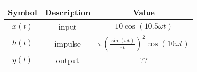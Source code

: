 \begin{tabular}{|c|c|c|}    \hline
     \textbf{Symbol} & \textbf{Description} &     \textbf{Value}\\
    \hline     $x(t)$ &  input &  $10 \cos(10.5 \omega t)$\\[6pt]
    \hline      $h(t)$ & impulse & $\pi\left(\frac{\sin(\omega t)}{\pi t}\right)^2 \cos(10 \omega t)$ \\[6pt]
    \hline     $y(t)$ &  output & ??\\[6pt]
    \hline     
\end{tabular}
